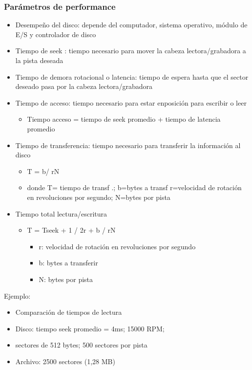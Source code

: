 \subsubsection{Parámetros de performance}
\begin{itemize}
\item Desempeño del disco: depende del computador, sistema operativo, módulo de E/S y controlador de disco
\item Tiempo de seek : tiempo necesario para mover la cabeza lectora/grabadora a la pista deseada
\item Tiempo de demora rotacional o latencia: tiempo de espera hasta que el sector deseado pasa por la cabeza lectora/grabadora
\item Tiempo de acceso: tiempo necesario para estar enposición para escribir o leer
	\begin{itemize}
	\item Tiempo acceso = tiempo de seek promedio + tiempo de latencia promedio
	\end{itemize}
\item Tiempo de transferencia: tiempo necesario para transferir la información al disco
	\begin{itemize}
	\item T = b/ rN 
	\item donde T= tiempo de transf .; b=bytes a transf 	r=velocidad de rotación en revoluciones por segundo; N=bytes por pista
	\end{itemize}
\item Tiempo total lectura/escritura
	\begin{itemize}
	\item T = Tseek + 1 / 2r + b / rN
		\begin{itemize}
		\item r: velocidad de rotación en revoluciones por segundo
		\item b: bytes a transferir
		\item N: bytes por pista
		\end{itemize}
	\end{itemize}
\end{itemize}

Ejemplo:
\begin{itemize}
\item Comparación de tiempos de lectura
\item Disco: tiempo seek promedio = 4ms; 15000 RPM;
\item sectores de 512 bytes; 500 sectores por pista
\item Archivo: 2500 sectores (1,28 MB)
\end{itemize}

